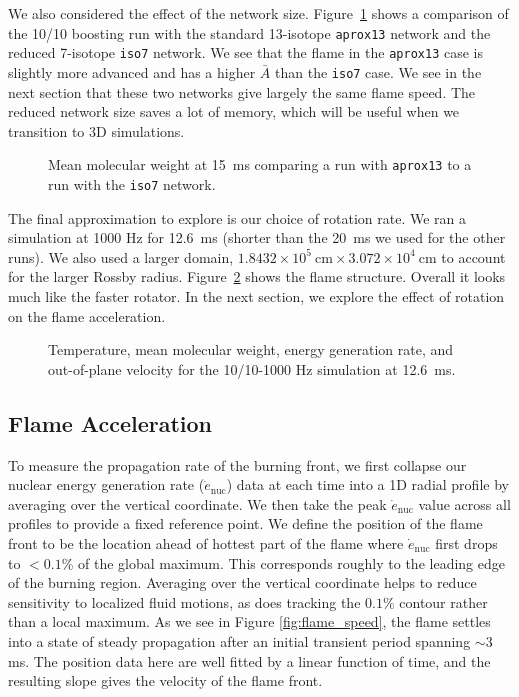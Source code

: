\documentclass[preprint,times,tighten]{aastex63}
\begin{document}
We also considered the effect of the network size.
Figure~\ref{fig:network} shows a comparison of the 10/10 boosting run
with the standard 13-isotope {\tt aprox13} network and the reduced
7-isotope {\tt iso7} network.  We see that the flame in the {\tt aprox13}
case is slightly more advanced and has a higher $\bar{A}$ than the {\tt iso7}
case.  We see in the next section that these two networks give largely
the same flame speed.  The reduced network size saves a lot of memory,
which will be useful when we transition to 3D simulations.

\begin{figure}[t]
\centering
{}
\caption{\label{fig:network} Mean molecular weight at 15~ms comparing a run with
  {\tt aprox13} to a run with the {\tt iso7} network.}
\end{figure}


The final approximation to explore is our choice of rotation rate.  We
ran a simulation at 1000 Hz for 12.6~ms (shorter than the 20~ms we
used for the other runs).  We also used a larger domain, $1.8432\times
10^5~\mathrm{cm} \times 3.072\times 10^4~\mathrm{cm}$ to account for
the larger Rossby radius.  Figure~\ref{fig:10_10_slow} shows the flame
structure.  Overall it looks much like the faster rotator.  In the
next section, we explore the effect of rotation on the flame
acceleration.

\begin{figure}[t]
\centering
{}
\caption{\label{fig:10_10_slow} Temperature, mean molecular weight, energy generation rate, and out-of-plane velocity for the 10/10-1000 Hz simulation at 12.6~ms.}
\end{figure}


\subsection{Flame Acceleration}

To measure the propagation rate of the burning front, we first collapse our nuclear
energy generation rate ($\dot{e}_\mathrm{nuc}$) data at each time into a 1D radial
profile by averaging over the vertical coordinate. We then take the peak
$\dot{e}_\mathrm{nuc}$ value across all profiles to provide a fixed reference point.
We define the position of the flame front to be the location ahead of hottest part of
the flame where $\dot{e}_\mathrm{nuc}$ first drops to $< 0.1 \%$ of the global maximum. 
This corresponds roughly to the leading edge of the burning region. Averaging
over the vertical coordinate helps to reduce sensitivity to localized fluid motions, as does
tracking the $0.1 \%$ contour rather than a local maximum. As we see in Figure
\ref{fig:flame_speed}, the flame settles into a state of steady propagation after an initial
transient period spanning $\sim 3$ ms. The position data here are well fitted by a linear
function of time, and the resulting slope gives the velocity of the flame front.
\end{document}
